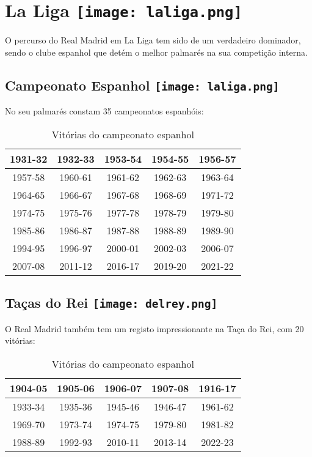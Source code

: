 \documentclass{report}
\begin{document}
\chapter{La Liga \protect\texttt{[image: laliga.png]}}
\label{chap.laliga}
O percurso do Real Madrid em La Liga tem sido de um verdadeiro dominador, sendo o clube espanhol que detém o melhor palmarés na sua competição interna.

\section{Campeonato Espanhol \protect\texttt{[image: laliga.png]}}
No seu palmarés constam 35 campeonatos espanhóis:
\begin{table}[h]
    \centering
    \begin{tabular}{|c|c|c|c|c|}
    \hline
    1931-32 & 1932-33 & 1953-54 & 1954-55 & 1956-57 \\ \hline
    1957-58 & 1960-61 & 1961-62 & 1962-63 & 1963-64 \\ \hline
    1964-65 & 1966-67 & 1967-68 & 1968-69 & 1971-72 \\ \hline
    1974-75 & 1975-76 & 1977-78 & 1978-79 & 1979-80 \\ \hline
    1985-86 & 1986-87 & 1987-88 & 1988-89 & 1989-90 \\ \hline
    1994-95 & 1996-97 & 2000-01 & 2002-03 & 2006-07 \\ \hline
    2007-08 & 2011-12 & 2016-17 & 2019-20  & 2021-22 \\ \hline
    \end{tabular}
    \caption{Vitórias do campeonato espanhol}
    \label{tab:vitorias}
\end{table}

\section{Taças do Rei \protect\texttt{[image: delrey.png]}}
O Real Madrid também tem um registo impressionante na Taça do Rei, com 20 vitórias:
\begin{table}[h]
    \centering
    \begin{tabular}{|c|c|c|c|c|}
    \hline
    1904-05 & 1905-06 & 1906-07 & 1907-08 & 1916-17 \\ \hline
    1933-34 & 1935-36 & 1945-46 & 1946-47 & 1961-62 \\ \hline
    1969-70 & 1973-74 & 1974-75 & 1979-80 & 1981-82 \\ \hline
    1988-89 & 1992-93 & 2010-11 & 2013-14 & 2022-23 \\ \hline
    \end{tabular}
    \caption{Vitórias do campeonato espanhol}
    \label{tab:vitorias}
\end{table}
\end{document}
